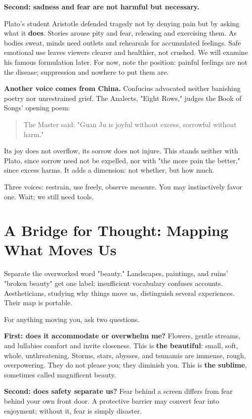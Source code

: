 \textbf{Second: sadness and fear are not harmful but necessary.}

Plato's student Aristotle defended tragedy not by denying pain but by asking what it \textbf{does}. Stories arouse pity and fear, releasing and exercising them. As bodies sweat, minds need outlets and rehearsals for accumulated feelings. Safe emotional use leaves viewers clearer and healthier, not crushed. We will examine his famous formulation later. For now, note the position: painful feelings are not the disease; suppression and nowhere to put them are.

\textbf{Another voice comes from China.} Confucius advocated neither banishing poetry nor unrestrained grief. The Analects, "Eight Rows," judges the Book of Songs' opening poem:

\begin{quote}
The Master said: "Guan Ju is joyful without excess, sorrowful without harm."
\end{quote}
Its joy does not overflow, its sorrow does not injure. This stands neither with Plato, since sorrow need not be expelled, nor with "the more pain the better," since excess harms. It adds a dimension: not whether, but how much.

Three voices: restrain, use freely, observe measure. You may instinctively favor one. Wait; we still need tools.

\section[Mapping What Moves Us]{A Bridge for Thought: Mapping What Moves Us}
Separate the overworked word "beauty." Landscapes, paintings, and ruins' "broken beauty" get one label; insufficient vocabulary confuses accounts. Aestheticians, studying why things move us, distinguish several experiences. Their map is portable.

For anything moving you, ask two questions.

\textbf{First: does it accommodate or overwhelm me?} Flowers, gentle streams, and lullabies comfort and invite closeness. This is \textbf{the beautiful}: small, soft, whole, unthreatening. Storms, stars, abysses, and tsunamis are immense, rough, overpowering. They do not please you; they diminish you. This is \textbf{the sublime}, sometimes called magnificent beauty.

\textbf{Second: does safety separate us?} Fear behind a screen differs from fear behind your own front door. A protective barrier may convert fear into enjoyment; without it, fear is simply disaster.

